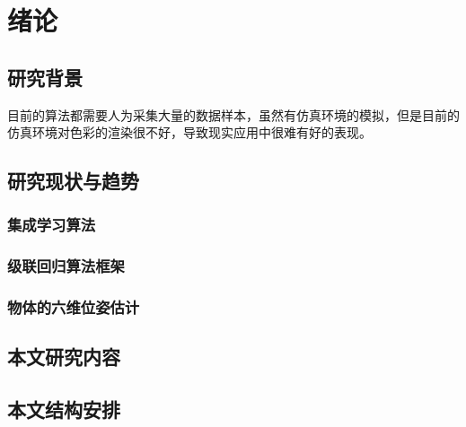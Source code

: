 \chapter{绪论}

\section{研究背景}

目前的算法都需要人为采集大量的数据样本，虽然有仿真环境的模拟，但是目前的仿真环境对色彩的渲染很不好，导致现实应用中很难有好的表现。

\section{研究现状与趋势} 
\subsection{集成学习算法} %
\subsection{级联回归算法框架} %
\subsection{物体的六维位姿估计}

\section{本文研究内容}

\section{本文结构安排}
